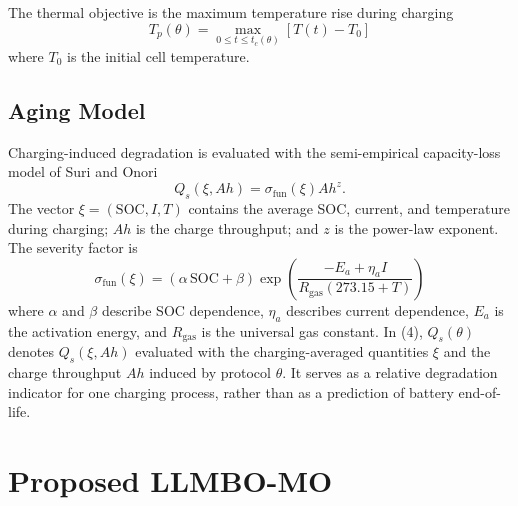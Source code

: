 \documentclass[journal,10pt]{IEEEtran}
\begin{document}
The thermal objective is the maximum temperature rise during charging
\begin{equation}
T_p(\theta)=\max_{0\le t\le t_c(\theta)}[T(t)-T_0]
\label{eq:peak_temp}
\end{equation}
where $T_0$ is the initial cell temperature.

\subsection{Aging Model}
\label{sec:aging}

Charging-induced degradation is evaluated with the semi-empirical
capacity-loss model of Suri and Onori~\cite{refAgingModel}
\begin{equation}
Q_s(\xi,Ah)=\sigma_{\mathrm{fun}}(\xi)Ah^z.
\label{eq:aging}
\end{equation}
The vector $\xi=(\mathrm{SOC},I,T)$ contains the average SOC, current, and
temperature during charging; $Ah$ is the charge throughput; and $z$ is the
power-law exponent. The severity factor is
\begin{equation}
\sigma_{\mathrm{fun}}(\xi)=(\alpha\,\mathrm{SOC}+\beta)\exp\!\left(\frac{-E_a+\eta_a I}{R_{\mathrm{gas}}(273.15+T)}\right)
\label{eq:severity}
\end{equation}
where $\alpha$ and $\beta$ describe SOC dependence, $\eta_a$ describes current
dependence, $E_a$ is the activation energy, and $R_{\mathrm{gas}}$ is the
universal gas constant. In (4), $Q_s(\theta)$ denotes $Q_s(\xi,Ah)$
evaluated with the charging-averaged quantities $\xi$ and the charge
throughput $Ah$ induced by protocol $\theta$. It serves as a relative
degradation indicator for one charging process, rather than as a prediction
of battery end-of-life.

\section{Proposed LLMBO-MO}
\label{sec:method}
\end{document}
